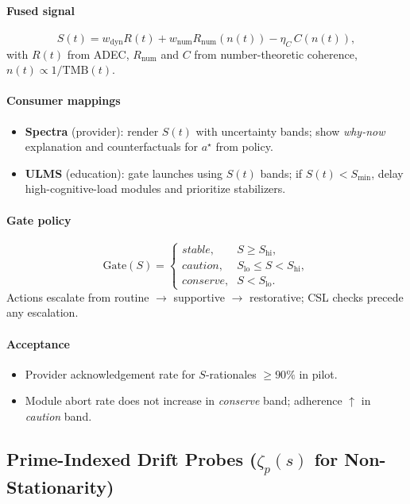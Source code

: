\documentclass[11pt]{article}
\theoremstyle{plain}
\begin{document}
\paragraph{Fused signal}
\[
S(t)=w_{\mathrm{dyn}}R(t)+w_{\mathrm{num}}R_{\mathrm{num}}(n(t))-\eta_C\,C(n(t)),
\]
with $R(t)$ from ADEC, $R_{\mathrm{num}}$ and $C$ from number-theoretic coherence, $n(t)\!\propto\!1/\mathrm{TMB}(t)$.

\paragraph{Consumer mappings}
\begin{itemize}
  \item \textbf{Spectra} (provider): render $S(t)$ with uncertainty bands; show \emph{why-now} explanation and counterfactuals for $a^\star$ from policy.
  \item \textbf{ULMS} (education): gate launches using $S(t)$ bands; if $S(t)\!<\!S_{\min}$, delay high-cognitive-load modules and prioritize stabilizers.
\end{itemize}

\paragraph{Gate policy}
\[
\text{Gate}(S)=
\begin{cases}
\textit{stable}, & S\ge S_{\mathrm{hi}},\\[2pt]
\textit{caution}, & S_{\mathrm{lo}} \le S < S_{\mathrm{hi}},\\[2pt]
\textit{conserve}, & S < S_{\mathrm{lo}}.
\end{cases}
\]
Actions escalate from routine $\rightarrow$ supportive $\rightarrow$ restorative; CSL checks precede any escalation.

\paragraph{Acceptance}
\begin{itemize}
  \item Provider acknowledgement rate for $S$-rationales $\ge 90\%$ in pilot.
  \item Module abort rate does not increase in \textit{conserve} band; adherence $\uparrow$ in \textit{caution} band.
\end{itemize}

\subsection{Prime-Indexed Drift Probes ($\zeta_p(s)$ for Non-Stationarity)}
\end{document}
